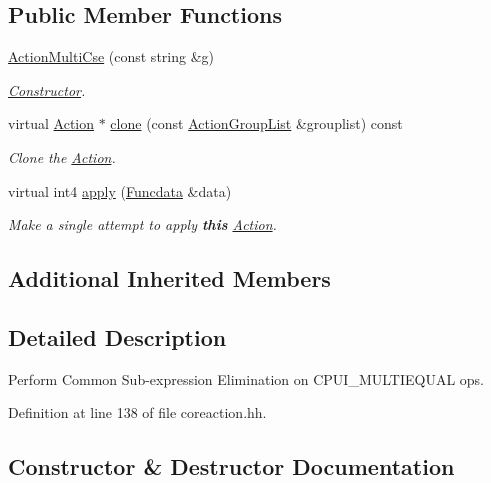\subsection*{Public Member Functions}
\begin{DoxyCompactItemize}
\item 
\mbox{\hyperlink{class_action_multi_cse_ad0077bb22d42f013f480c32a7da7acfa}{Action\+Multi\+Cse}} (const string \&g)
\begin{DoxyCompactList}\small\item\em \mbox{\hyperlink{class_constructor}{Constructor}}. \end{DoxyCompactList}\item 
virtual \mbox{\hyperlink{class_action}{Action}} $\ast$ \mbox{\hyperlink{class_action_multi_cse_a553b599fdf59ccb9c193740e7aabfc80}{clone}} (const \mbox{\hyperlink{class_action_group_list}{Action\+Group\+List}} \&grouplist) const
\begin{DoxyCompactList}\small\item\em Clone the \mbox{\hyperlink{class_action}{Action}}. \end{DoxyCompactList}\item 
virtual int4 \mbox{\hyperlink{class_action_multi_cse_a7a79627973a87279ddcadc497c516c2e}{apply}} (\mbox{\hyperlink{class_funcdata}{Funcdata}} \&data)
\begin{DoxyCompactList}\small\item\em Make a single attempt to apply {\bfseries{this}} \mbox{\hyperlink{class_action}{Action}}. \end{DoxyCompactList}\end{DoxyCompactItemize}
\subsection*{Additional Inherited Members}


\subsection{Detailed Description}
Perform Common Sub-\/expression Elimination on C\+P\+U\+I\+\_\+\+M\+U\+L\+T\+I\+E\+Q\+U\+AL ops. 

Definition at line 138 of file coreaction.\+hh.



\subsection{Constructor \& Destructor Documentation}
\mbox{\label{class_action_multi_cse_ad0077bb22d42f013f480c32a7da7acfa}} 
